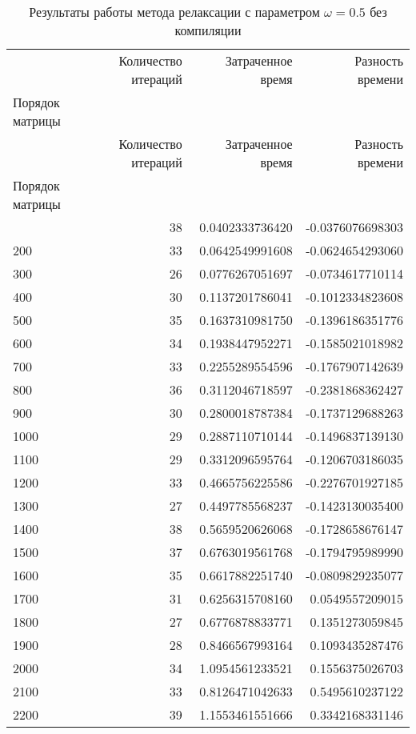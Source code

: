 \begin{longtable}{lrrr}
\caption{Результаты работы метода релаксации с параметром $\omega=0.5$ без компиляции}\\
\toprule
 & Количество итераций & Затраченное время & Разность времени \\
Порядок матрицы &  &  &  \\
\midrule
\endfirsthead
\toprule
 & Количество итераций & Затраченное время & Разность времени \\
Порядок матрицы &  &  &  \\
\midrule
\endhead
\midrule
\midrule
\endfoot
\bottomrule
\endlastfoot
100 & 38 & 0.0402333736420 & -0.0376076698303 \\
200 & 33 & 0.0642549991608 & -0.0624654293060 \\
300 & 26 & 0.0776267051697 & -0.0734617710114 \\
400 & 30 & 0.1137201786041 & -0.1012334823608 \\
500 & 35 & 0.1637310981750 & -0.1396186351776 \\
600 & 34 & 0.1938447952271 & -0.1585021018982 \\
700 & 33 & 0.2255289554596 & -0.1767907142639 \\
800 & 36 & 0.3112046718597 & -0.2381868362427 \\
900 & 30 & 0.2800018787384 & -0.1737129688263 \\
1000 & 29 & 0.2887110710144 & -0.1496837139130 \\
1100 & 29 & 0.3312096595764 & -0.1206703186035 \\
1200 & 33 & 0.4665756225586 & -0.2276701927185 \\
1300 & 27 & 0.4497785568237 & -0.1423130035400 \\
1400 & 38 & 0.5659520626068 & -0.1728658676147 \\
1500 & 37 & 0.6763019561768 & -0.1794795989990 \\
1600 & 35 & 0.6617882251740 & -0.0809829235077 \\
1700 & 31 & 0.6256315708160 & 0.0549557209015 \\
1800 & 27 & 0.6776878833771 & 0.1351273059845 \\
1900 & 28 & 0.8466567993164 & 0.1093435287476 \\
2000 & 34 & 1.0954561233521 & 0.1556375026703 \\
2100 & 33 & 0.8126471042633 & 0.5495610237122 \\
2200 & 39 & 1.1553461551666 & 0.3342168331146 \\

\end{longtable}
